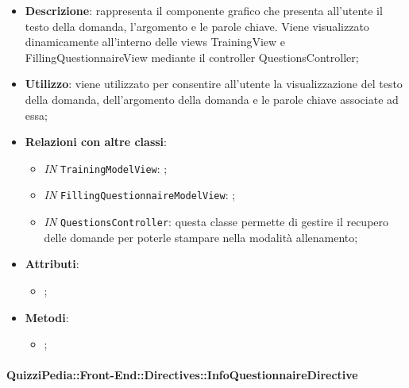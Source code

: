 		\begin{itemize}
			\item \textbf{Descrizione}: rappresenta il componente grafico che presenta all'utente il testo della domanda, l'argomento e le parole chiave. Viene visualizzato dinamicamente all'interno delle views TrainingView e FillingQuestionnaireView mediante il controller QuestionsController;
			\item \textbf{Utilizzo}: viene utilizzato per consentire all'utente la visualizzazione del testo della domanda, dell'argomento della domanda e le parole chiave associate ad essa;
			\item \textbf{Relazioni con altre classi}: 
			\begin{itemize}
				\item \textit{IN} \texttt{TrainingModelView}: ; 
				\item \textit{IN} \texttt{FillingQuestionnaireModelView}: ;
				\item \textit{IN} \texttt{QuestionsController}: questa classe permette di gestire il recupero delle domande per poterle stampare nella modalità allenamento;
			\end{itemize}
			\item \textbf{Attributi}: 
			\begin{itemize}
				\item ;
			\end{itemize}
			\item \textbf{Metodi}: 
			\begin{itemize}
				\item ;
			\end{itemize}
		\end{itemize}
		
		\paragraph{QuizziPedia::Front-End::Directives::InfoQuestionnaireDirective}
		
		\label{QuizziPedia::Front-End::Directives::InfoQuestionnaireDirective}
		
